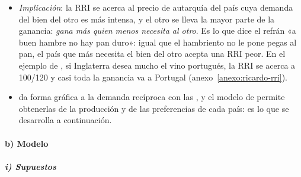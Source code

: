 \documentclass[11pt]{article}
\begin{document}
\begin{itemize}
  Es la balanza comercial equilibrada del trueque: el valor de lo que A exporta es el de lo que importa.
\item \emph{Implicación}: la RRI se acerca al precio de autarquía del país cuya demanda del bien del otro es más intensa, y el otro se lleva la mayor parte de la ganancia: \emph{gana más quien menos necesita al otro}. Es lo que dice el refrán «a buen hambre no hay pan duro»: igual que el hambriento no le pone pegas al pan, el país que más necesita el bien del otro acepta una RRI peor. En el ejemplo de , si Inglaterra desea mucho el vino portugués, la RRI se acerca a 100/120 y casi toda la ganancia va a Portugal (anexo~\ref{anexo:ricardo-rri}).
\item {} da forma gráfica a la demanda recíproca con las , y el modelo de  permite obtenerlas de la producción y de las preferencias de cada país: es lo que se desarrolla a continuación.
\end{itemize}

\paragraph{b) Modelo}

\subparagraph{i) Supuestos}
\end{document}

